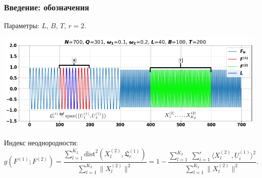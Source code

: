 \documentclass[pdf, 9pt,intlimits, unicode]{beamer}
\DeclareMathOperator{\mathspan}{span}
\newcommand\eqdef{\mathrel{\stackrel{\makebox[0pt]{\mbox{\normalfont\tiny def}}}{=}}}
\begin{document}
	\begin{frame}
		\frametitle{Введение: обозначения}	
		{\color{blue} Параметры:} $ L $, $ B $, $ T $, $ r = 2 $.
		\begin{center}
			\includegraphics[width=\linewidth]{imgs/designations}
		\end{center}

		\bigskip
		
		{\color{blue} Индекс неоднородности:} 
		\small{
			$$ g(F^{(1)}; F^{(2)}) = \frac{\sum\limits_{l=1}^{K_2}\mathrm{dist}^2(X_l^{(2)}, \mathfrak{L}_r^{(1)})}{\sum\limits_{l=1}^{K_2}\|X_l^{(2)}\|^2} =
			1 - \frac{\sum\limits_{l=1}^{K_2}\;\sum\limits_{i=1}^{r}\langle X_l^{(2)}, U_i^{(1)}\rangle^2}{\sum\limits_{l=1}^{K_2}\|X_l^{(2)}\|^2}. $$
		}
	\end{frame}
\end{document}
